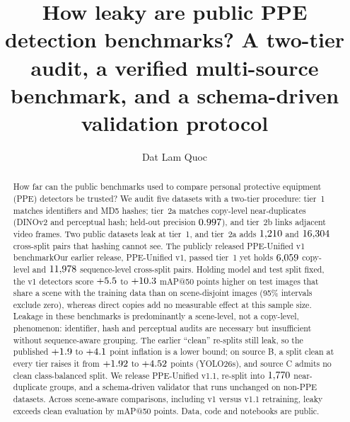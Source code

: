 \documentclass[review,12pt]{elsarticle}
\newcommand{\anonor}[2]{\ifdefined\ANON#1\else#2\fi}
\begin{document}
\linenumbers

\begin{frontmatter}

\title{How leaky are public PPE detection benchmarks? A two-tier audit,
a verified multi-source benchmark, and a schema-driven validation
protocol}

\ifdefined\ANON
\else
\author[fsb]{Dat Lam Quoc}
\fi

\begin{abstract}
How far can the public benchmarks used to compare personal protective
equipment (PPE) detectors be trusted? We audit five datasets with a
two-tier procedure: tier~1 matches identifiers and MD5 hashes;
tier~2a matches copy-level near-duplicates (DINOv2 and perceptual hash;
held-out precision $0.997$), and tier~2b links
adjacent video frames. Two public datasets leak at tier~1, and
tier~2a adds $1{,}210$ and $16{,}304$ cross-split pairs that
hashing cannot see. \anonor{The publicly released PPE-Unified v1 benchmark}{Our earlier release, PPE-Unified v1,} passed
tier~1 yet holds $6{,}059$ copy-level and $11{,}978$ sequence-level
cross-split pairs. Holding model and test split fixed, the v1 detectors
score $+5.5$ to $+10.3$ mAP@50 points higher on
test images that share a scene with the training data than on
scene-disjoint images (95\% intervals exclude zero), whereas direct
copies add no measurable effect at this sample size. Leakage in these benchmarks is predominantly a scene-level, not a
copy-level, phenomenon: identifier, hash and perceptual audits are
necessary but insufficient without sequence-aware grouping. The
earlier ``clean'' re-splits still leak, so the published $+1.9$ to
$+4.1$ point inflation is a lower bound; on source B, a split
clean at every tier raises it from $+1.92$ to
$+4.52$ points (YOLO26s), and source C admits no clean
class-balanced split. We release PPE-Unified v1.1, re-split into
$1{,}770$ near-duplicate groups, and a schema-driven validator that
runs unchanged on non-PPE datasets. Across scene-aware comparisons,
including v1 versus v1.1 retraining, leaky exceeds clean evaluation by
\ninflRange{} mAP@50 points. Data, code and notebooks are public.
\end{abstract}


\end{frontmatter}
\end{document}
